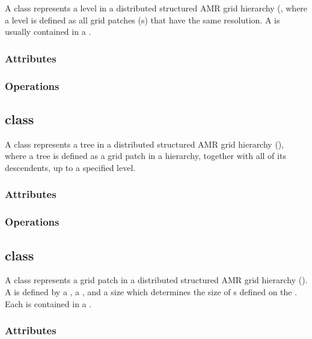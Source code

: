 \documentclass{article}
\begin{document}
A  class represents a level in a distributed structured
AMR grid hierarchy (, where a level is defined as all
grid patches (s) that have the same resolution.  A 
is usually contained in a .


\subsubsection{Attributes}

\subsubsection{Operations}

\subsection{ class}

A  class represents a tree in a distributed structured AMR
grid hierarchy (), where a tree is defined as a grid patch
in a hierarchy, together with all of its descendents, up to a specified
level.


\subsubsection{Attributes}

\subsubsection{Operations}

\subsection{ class}

A  class represents a grid patch in a distributed structured
AMR grid hierarchy ().  A  is defined by a
, a , and a size which determines
the size of s defined on the .  Each
 is contained in a .

\subsubsection{Attributes}
\end{document}
